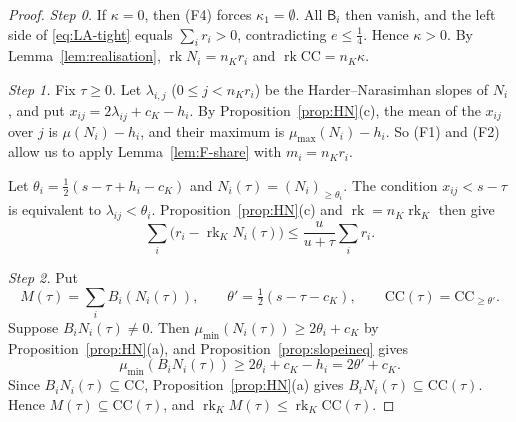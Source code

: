 \documentclass[10pt]{amsart}
\theoremstyle{definition}
\theoremstyle{remark}
\begin{document}
\begin{proof}
\emph{Step 0.} If $\kappa=0$, then (F4) forces $\kappa_1=\emptyset$. All $\mathsf B_i$ then vanish, and the left side of \eqref{eq:LA-tight} equals $\sum_ir_i>0$, contradicting $e\le\frac14$. Hence $\kappa>0$. By Lemma~\ref{lem:realisation}, $\operatorname{rk}N_i=n_Kr_i$ and $\operatorname{rk}\mathrm{CC}=n_K\kappa$.

\emph{Step 1.} Fix $\tau\ge0$. Let $\lambda_{i,j}$ ($0\le j<n_Kr_i$) be the Harder--Narasimhan slopes of $N_i$, and put $x_{ij}=2\lambda_{ij}+c_K-h_i$. By Proposition~\ref{prop:HN}(c), the mean of the $x_{ij}$ over $j$ is $\mu(N_i)-h_i$, and their maximum is $\mu_{\max}(N_i)-h_i$. So (F1) and (F2) allow us to apply Lemma~\ref{lem:F-share} with $m_i=n_Kr_i$.

Let $\theta_i=\frac12(s-\tau+h_i-c_K)$ and $N_i(\tau)=(N_i)_{\ge\theta_i}$. The condition $x_{ij}<s-\tau$ is equivalent to $\lambda_{ij}<\theta_i$. Proposition~\ref{prop:HN}(c) and $\operatorname{rk}=n_K\operatorname{rk}_K$ then give
\begin{equation}\label{eq:F-corank}
\sum_i\bigl(r_i-\operatorname{rk}_KN_i(\tau)\bigr)\le\frac{u}{u+\tau}\sum_ir_i .
\end{equation}

\emph{Step 2.} Put
\[
M(\tau)=\sum_iB_i(N_i(\tau)),\qquad \theta'=\tfrac12(s-\tau-c_K),\qquad \mathrm{CC}(\tau)=\mathrm{CC}_{\ge\theta'}.
\]
Suppose $B_iN_i(\tau)\neq0$. Then $\mu_{\min}(N_i(\tau))\ge2\theta_i+c_K$ by Proposition~\ref{prop:HN}(a), and Proposition~\ref{prop:slopeineq} gives
\[
\mu_{\min}(B_iN_i(\tau))\ge2\theta_i+c_K-h_i=2\theta'+c_K .
\]
Since $B_iN_i(\tau)\subseteq\mathrm{CC}$, Proposition~\ref{prop:HN}(a) gives $B_iN_i(\tau)\subseteq\mathrm{CC}(\tau)$. Hence $M(\tau)\subseteq\mathrm{CC}(\tau)$, and $\operatorname{rk}_KM(\tau)\le\operatorname{rk}_K\mathrm{CC}(\tau)$.


\end{proof}
\end{document}

